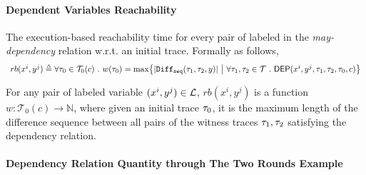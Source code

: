 \paragraph*{Dependent Variables Reachability}
%
\begin{defn}
  \label{def:adapt-depvar_reachability}
  The execution-based reachability time for every pair of 
  labeled in the
  \emph{may-dependency} relation w.r.t. an initial trace. Formally as follows,
    \[
    \begin{array}{l}
        rb(x^i, y^j) \triangleq 
\forall \trace_0 \in \mathcal{T}_0(c) \sthat
  w (\trace_0) = \max \left\{ | \sdiff(\trace_1, \trace_2, y)|
  ~\middle\vert~
  \forall \trace_1, \trace_2 \in \mathcal{T} \sthat \dep(x^i, y^j,\trace_1, \trace_2, \trace_0, c) \right\}
\end{array}
\]
\end{defn}
%
For any pair of labeled variable $(x^i, y^j) \in \mathcal{L}$, 
$ rb(x^i, y^j)$ is a function $w: \mathcal{T}_0(c) \to \mathbb{N}$,
    where given an initial trace $\mathtt{\tau}_0$,
    it is the maximum length of the difference sequence between all pairs of the witness traces $\mathtt{\tau}_1, \mathtt{\tau}_2$ 
    satisfying the dependency relation.

\paragraph*{Dependency Relation Quantity through The Two Rounds Example}
